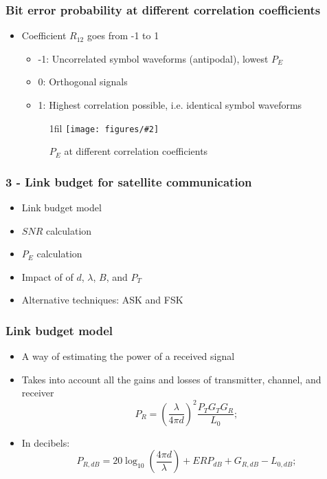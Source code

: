 \documentclass{beamer}
\makeatletter
\newcommand*{\centerfloat}{%
  \parindent \z@
  \leftskip \z@ \@plus 1fil \@minus \textwidth
  \rightskip\leftskip
  \parfillskip \z@skip}
\newcommand{\fig}[3]{
  \begin{figure}[H]
  \centerfloat
    \texttt{[image: figures/\#2]}
	\caption{#3}
  \end{figure}
}
\makeatother
\begin{document}
\begin{frame}
	\frametitle{Bit error probability at different correlation coefficients}
	\begin{itemize}
		\item Coefficient $R_{12}$ goes from -1 to 1
		\begin{itemize}
			\item -1: Uncorrelated symbol waveforms (antipodal), lowest $P_E$
			\item 0: Orthogonal signals
			\item 1: Highest correlation possible, i.e. identical symbol waveforms
		\end{itemize}
		\fig{4cm}{pe_r12.png}{$P_E$ at different correlation coefficients}
	\end{itemize}
\end{frame}


\begin{frame}
	\frametitle{3 - Link budget for satellite communication}
	\begin{Large}
		\begin{itemize}
			\item Link budget model
			\item $SNR$ calculation
			\item $P_E$ calculation
			\item Impact of of $d$, $\lambda$, $B$, and $P_T$
			\item Alternative techniques: ASK and FSK
		\end{itemize}
	\end{Large}
\end{frame}

\begin{frame}
	\frametitle{Link budget model}
	\begin{itemize}
		\item A way of estimating the power of a received signal
		\item Takes into account all the gains and losses of transmitter, channel, and receiver
		\begin{equation}
			P_R = \left(\frac{\lambda}{4 \pi d}\right)^2 \frac{P_T G_T G_R}{L_0};
		\end{equation}
		\item In decibels:
		\begin{equation}
			P_{R, dB} = 20\log_{10}\left(\frac{4 \pi d}{\lambda}\right) + {ERP}_{dB} + G_{R, dB} - L_{0, dB};
		\end{equation}
	\end{itemize}
\end{frame}
\end{document}
